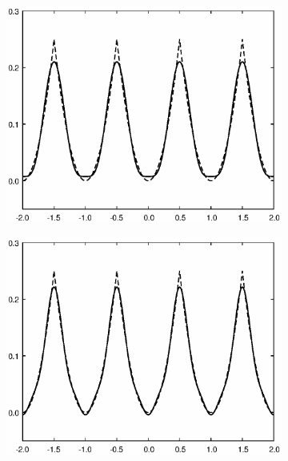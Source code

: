 \documentclass[11pt,a4paper]{article}
\begin{document}
\begin{figure}[htbp]
\begin{subfigure}{0.48\textwidth}
\end{subfigure}
\begin{subfigure}{0.48\textwidth}
\includegraphics[scale=0.5]{approx1_002}
\end{subfigure}
\begin{subfigure}{0.48\textwidth}
\includegraphics[scale=0.5]{approx1_003}
\end{subfigure}
\begin{subfigure}{0.48\textwidth}

\end{subfigure}
\end{figure}
\end{document}
